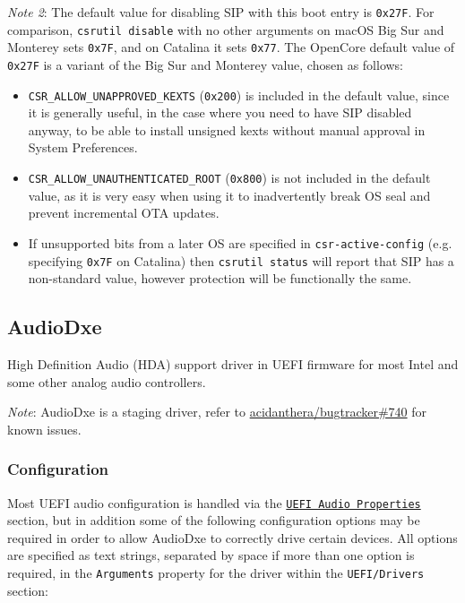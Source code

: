 \documentclass[]{article}
\makeatletter
\providecommand{\tightlist}{%
  \setlength{\itemsep}{0pt}\setlength{\parskip}{0pt}}
\renewcommand{\label}[1]{%
\zref@wrapper@immediate{\oldlabel{#1}}}  %
\makeatother
\begin{document}
\emph{Note 2}: The default value for disabling SIP with this boot entry is \texttt{0x27F}.
For comparison, \texttt{csrutil disable} with no other arguments on macOS Big Sur and Monterey
sets \texttt{0x7F}, and on Catalina it sets \texttt{0x77}. The OpenCore default value of \texttt{0x27F}
is a variant of the Big Sur and Monterey value, chosen as follows:
\begin{itemize}
\tightlist
\item \texttt{CSR\_ALLOW\_UNAPPROVED\_KEXTS} (\texttt{0x200}) is included in the default value,
since it is generally useful, in the case where you need to have SIP disabled anyway, to be
able to install unsigned kexts without manual approval in System Preferences.
\item \texttt{CSR\_ALLOW\_UNAUTHENTICATED\_ROOT} (\texttt{0x800}) is not included in the default
value, as it is very easy when using it to inadvertently break OS seal and prevent incremental OTA updates.
\item If unsupported bits from a later OS are specified in \texttt{csr-active-config}
(e.g. specifying \texttt{0x7F} on Catalina) then \texttt{csrutil status}
will report that SIP has a non-standard value, however protection will be functionally the same.
\end{itemize}

\subsection{AudioDxe}\label{uefiaudio}

High Definition Audio (HDA) support driver in UEFI firmware for most Intel and some other analog audio controllers.

\emph{Note}: AudioDxe is a staging driver, refer to \href{https://github.com/acidanthera/bugtracker/issues/740}{acidanthera/bugtracker\#740}
for known issues.

\subsubsection{Configuration}

Most UEFI audio configuration is handled via the \hyperref[uefiaudioprops]{\texttt{UEFI Audio Properties}}
section, but in addition some of the following configuration options may be required in order
to allow AudioDxe to correctly drive certain devices. All options are specified as text strings,
separated by space if more than one option is required, in the \texttt{Arguments} property for
the driver within the \texttt{UEFI/Drivers} section:
\end{document}

